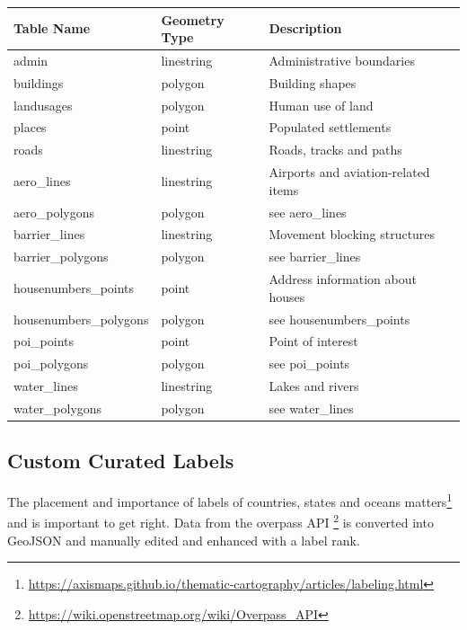 \begin{flushleft}
    \begin{tabular}{lll}
    \hline
    Table Name            & Geometry Type & Description \\
    \hline                                          
    admin                  & linestring    & Administrative boundaries \\
    buildings              & polygon       & Building shapes                            \\
    landusages             & polygon       & Human use of land \\
    places                 & point         & Populated settlements                      \\
    roads                  & linestring    & Roads, tracks and paths          \\
    aero\_lines            & linestring    & Airports and aviation-related items        \\
    aero\_polygons         & polygon       & see aero\_lines                            \\
    barrier\_lines         & linestring    & Movement blocking structures   \\
    barrier\_polygons      & polygon       & see barrier\_lines                         \\
    housenumbers\_points   & point         & Address information about houses \\
    housenumbers\_polygons & polygon       & see housenumbers\_points                   \\
    poi\_points            & point         & Point of interest                          \\
    poi\_polygons          & polygon       & see poi\_points                            \\
    water\_lines           & linestring    & Lakes and rivers                           \\
    water\_polygons        & polygon       & see water\_lines                           \\
    \end{tabular}
\end{flushleft}

\subsection{Custom Curated Labels}

The placement and importance of labels of countries, states and oceans matters\footnote{\url{https://axismaps.github.io/thematic-cartography/articles/labeling.html}} and is important to get right. Data from the overpass API \footnote{\url{https://wiki.openstreetmap.org/wiki/Overpass_API}} is converted into GeoJSON and
manually edited and enhanced with a label rank.

